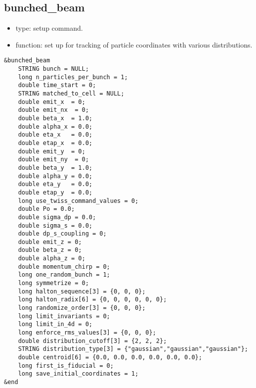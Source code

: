 \documentclass[11pt]{article}
\begin{document}
\subsection{bunched\_beam}

\begin{itemize}
\item type: setup command.
\item function: set up for tracking of particle coordinates with various distributions.
\end{itemize}

\begin{verbatim}
&bunched_beam
    STRING bunch = NULL;
    long n_particles_per_bunch = 1;
    double time_start = 0;
    STRING matched_to_cell = NULL;
    double emit_x  = 0;
    double emit_nx  = 0;
    double beta_x  = 1.0;
    double alpha_x = 0.0;
    double eta_x   = 0.0;
    double etap_x  = 0.0;
    double emit_y  = 0;
    double emit_ny  = 0;
    double beta_y  = 1.0;
    double alpha_y = 0.0;
    double eta_y   = 0.0;
    double etap_y  = 0.0;
    long use_twiss_command_values = 0;
    double Po = 0.0;
    double sigma_dp = 0.0;
    double sigma_s = 0.0;
    double dp_s_coupling = 0;
    double emit_z = 0;
    double beta_z = 0;
    double alpha_z = 0;
    double momentum_chirp = 0;
    long one_random_bunch = 1;
    long symmetrize = 0;
    long halton_sequence[3] = {0, 0, 0};
    long halton_radix[6] = {0, 0, 0, 0, 0, 0};
    long randomize_order[3] = {0, 0, 0};
    long limit_invariants = 0;
    long limit_in_4d = 0;
    long enforce_rms_values[3] = {0, 0, 0};
    double distribution_cutoff[3] = {2, 2, 2};
    STRING distribution_type[3] = {"gaussian","gaussian","gaussian"};
    double centroid[6] = {0.0, 0.0, 0.0, 0.0, 0.0, 0.0};
    long first_is_fiducial = 0;
    long save_initial_coordinates = 1;
&end
\end{verbatim}
\end{document}
